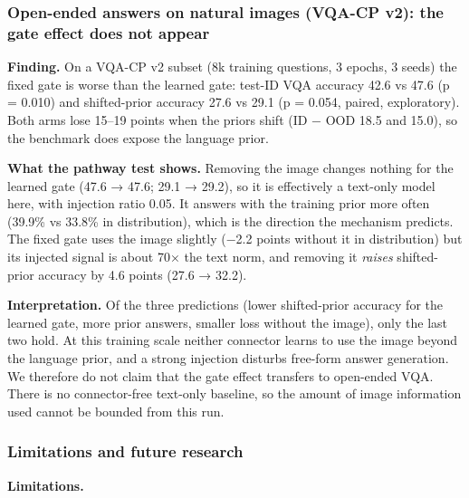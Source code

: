 \subsubsection{Open-ended answers on natural images (VQA-CP v2): the gate effect does not appear}

\textbf{Finding.} On a VQA-CP v2 subset (8k training questions, 3 epochs, 3 seeds) the fixed gate is worse than the
learned gate: test-ID VQA accuracy 42.6 vs 47.6 (p = 0.010) and shifted-prior accuracy 27.6 vs 29.1 (p = 0.054,
paired, exploratory). Both arms lose 15--19 points when the priors shift (ID − OOD 18.5 and 15.0), so the benchmark does
expose the language prior.

\textbf{What the pathway test shows.} Removing the image changes nothing for the learned gate (47.6 → 47.6; 29.1 → 29.2),
so it is effectively a text-only model here, with injection ratio 0.05. It answers with the training prior more
often (39.9\% vs 33.8\% in distribution), which is the direction the mechanism predicts. The fixed gate uses the image
slightly (−2.2 points without it in distribution) but its injected signal is about 70× the text norm, and removing it
\emph{raises} shifted-prior accuracy by 4.6 points (27.6 → 32.2).

\textbf{Interpretation.} Of the three predictions (lower shifted-prior accuracy for the learned gate, more prior answers,
smaller loss without the image), only the last two hold. At this training scale neither connector learns to use the
image beyond the language prior, and a strong injection disturbs free-form answer generation. We therefore do not
claim that the gate effect transfers to open-ended VQA. There is no connector-free text-only baseline, so the
amount of image information used cannot be bounded from this run.

\subsubsection{Limitations and future research}

\textbf{Limitations.}

